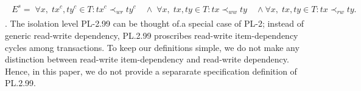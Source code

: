 \documentclass[acmlarge, ,11pt]{acmart}
\begin{document}
\begin{align}
\begin{split}
E^{s} =  \; \forall x, \; \mathit{tx}^{c}, \mathit{ty}^{c} \in T: 
\mathit{tx}^{c} \prec_{\mathit{wr}} \mathit{ty}^{c} %
 \quad \wedge 
\; \forall x, \; \mathit{tx}, \mathit{ty} \in T: 
\mathit{tx} \prec_{\mathit{ww}} \mathit{ty} %
 \quad \wedge 
\forall x, \; \mathit{tx}, \mathit{ty} \in T: \mathit{tx} \prec_{\mathit{rw}} \mathit{ty}. %
\end{split}
  \end{align}.
  The isolation level  PL-2.99 can be thought of.a special case of PL-2; instead of generic  read-write dependency, PL.2.99 proscribes read-write item-dependency cycles among transactions. To keep our definitions simple, we do not make any distinction between  read-write item-dependency and  read-write dependency. Hence, in this paper, we do not provide a separarate specification definition of  PL.2.99. %
\end{document}
